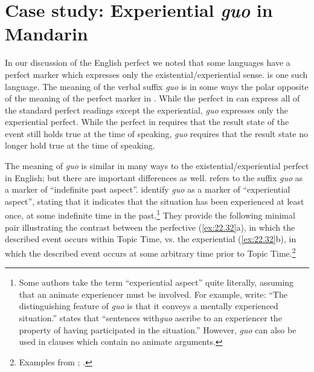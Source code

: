 \section{Case study: Experiential \textit{guo} in Mandarin}\label{sec:22.6}

In our discussion of the English perfect we noted that some languages have a perfect marker which expresses only the existential/experiential sense.  is one such language. The meaning of the verbal suffix \textit{guo} is in some ways the polar opposite of the meaning of the perfect marker in . While the perfect in  can express all of the standard perfect readings except the experiential, \textit{guo} expresses only the experiential perfect. While the perfect in  requires that the result state of the event still holds true at the time of speaking, \textit{guo} requires that the result state no longer hold true at the time of speaking.



The meaning of  \textit{guo} is similar in many ways to the existential/experiential perfect in English; but there are important differences as well. \citet{Chao1968} refers to the suffix \textit{guo} as a marker of “indefinite past aspect”. \citet[226]{LiThompson1981} identify \textit{guo} as a marker of “experiential aspect”, stating that it indicates that the situation has been experienced at least once, at some indefinite time in the past.\footnote{Some authors take the term “experiential aspect” quite literally, assuming that an animate experiencer must be involved. For example, \citet[144]{XiaoMcEnery2004} write: “The distinguishing feature of \textit{guo} is that it conveys a mentally experienced situation.” \citet[267]{Smith1997} states that “sentences with\textit{guo} ascribe to an experiencer the property of having participated in the situation.” However, \textit{guo} can also be used in clauses which contain no animate arguments.} They provide the following minimal pair illustrating the contrast between the perfective (\ref{ex:22.32}a), in which the described event occurs within Topic Time, vs. the experiential (\ref{ex:22.32}b), in which the described event occurs at some arbitrary time prior to Topic Time.\footnote{Examples from \citet[19]{Ma1977}; \citet[227]{LiThompson1981}.}


